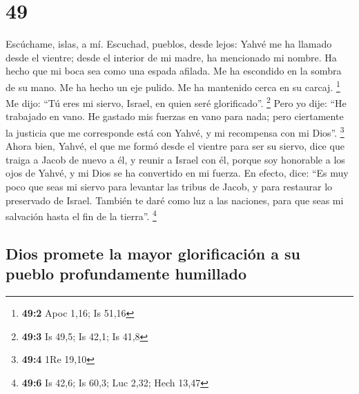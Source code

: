 \hypertarget{section-48}{%
\section{49}\label{section-48}}

 Escúchame, islas, a mí. Escuchad, pueblos, desde lejos:
Yahvé me ha llamado desde el vientre; desde el interior de mi madre, ha
mencionado mi nombre.  Ha hecho que mi boca sea como una
espada afilada. Me ha escondido en la sombra de su mano. Me ha hecho un
eje pulido. Me ha mantenido cerca en su carcaj. \footnote{\textbf{49:2}
  Apoc 1,16; Is 51,16}  Me dijo: ``Tú eres mi siervo,
Israel, en quien seré glorificado''. \footnote{\textbf{49:3} Is 49,5; Is
  42,1; Is 41,8}  Pero yo dije: ``He trabajado en vano. He
gastado mis fuerzas en vano para nada; pero ciertamente la justicia que
me corresponde está con Yahvé, y mi recompensa con mi Dios''.
\footnote{\textbf{49:4} 1Re 19,10}  Ahora bien, Yahvé, el
que me formó desde el vientre para ser su siervo, dice que traiga a
Jacob de nuevo a él, y reunir a Israel con él, porque soy honorable a
los ojos de Yahvé, y mi Dios se ha convertido en mi fuerza.
 En efecto, dice: ``Es muy poco que seas mi siervo para
levantar las tribus de Jacob, y para restaurar lo preservado de Israel.
También te daré como luz a las naciones, para que seas mi salvación
hasta el fin de la tierra''. \footnote{\textbf{49:6} Is 42,6; Is 60,3;
  Luc 2,32; Hech 13,47}

\hypertarget{dios-promete-la-mayor-glorificaciuxf3n-a-su-pueblo-profundamente-humillado}{%
\subsection{Dios promete la mayor glorificación a su pueblo
profundamente
humillado}\label{dios-promete-la-mayor-glorificaciuxf3n-a-su-pueblo-profundamente-humillado}}

